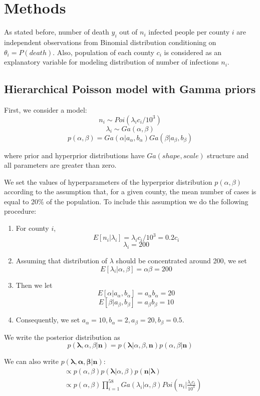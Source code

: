 \documentclass[11pt,twocolumn]{asaproc}
\begin{document}
\section{Methods}

As stated before, number of death $y_i$ out of $n_i$ infected people per county $i$ are independent observations from Binomial distribution conditioning on $\theta_i = P(death)$. Also, population of each county $c_i$ is considered as an explanatory variable for modeling distribution of number of infections $n_i$. 



\subsection{Hierarchical Poisson model with Gamma priors}
First, we consider a model: 
$$n_i \sim Poi(\lambda_i c_i/10^3)$$
$$\lambda_i \sim Ga(\alpha, \beta)$$
$$p(\alpha, \beta) = Ga(\alpha |a_{\alpha}, b_{\alpha})Ga(\beta | a_{\beta}, b_{\beta})$$

where prior and hyperprior distributions have $Ga(shape, scale)$ structure and all parameters are greater than zero. 

We set the values of hyperparameters of the hyperprior distribution $p(\alpha, \beta)$ according to the assumption that, for a given county, the mean number of cases is equal to 20\% of the population. To include this assumption we do the following procedure:

\begin{enumerate}
\item For county $i$, $$E[n_i | \lambda_i] = \lambda_i c_i/10^3 = 0.2c_i$$ $$\lambda_i = 200$$
\item Assuming that distribution of $\lambda$ should be concentrated around 200, we set $$E[\lambda_i|\alpha, \beta] = \alpha\beta = 200$$
\item Then we let $$E[\alpha|a_{\alpha}, b_{\alpha}] = a_{\alpha}b_{\alpha} = 20 $$ $$E[\beta|a_{\beta}, b_{\beta}] = a_{\beta}b_{\beta} =10 $$
\item Consequently, we set $a_{\alpha} = 10, b_{\alpha} = 2, a_{\beta} = 20, b_{\beta} = 0.5$. 
\end{enumerate}

We write the posterior distribution as $$p(\mathbf{\lambda}, \alpha, \beta| \mathbf{n}) = p(\mathbf{\lambda}|\alpha, \beta, \mathbf{n})p(\alpha, \beta| \mathbf{n})$$ 

We can also write $p(\mathbf{\lambda, \alpha, \beta}| \mathbf{n})$: 
\begin{align*}
& \propto p(\alpha, \beta)p(\mathbf{\lambda}|\alpha, \beta)p(\mathbf{n}|\mathbf{\lambda}) \\
&\propto p(\alpha, \beta)\prod_{i=1}^{58}Ga({\lambda_i|\alpha, \beta})Poi(n_i|\frac{\lambda_i c_i}{10^3})
\end{align*}
\end{document}
